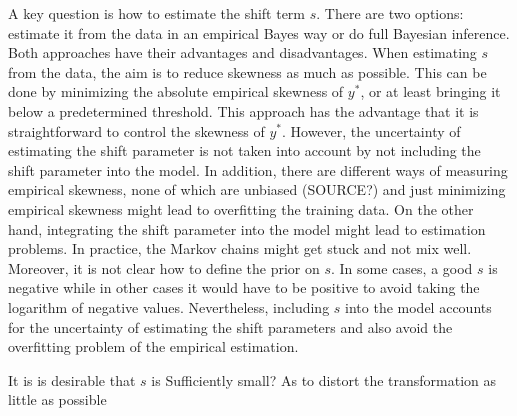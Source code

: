 A key question is how to estimate the shift term $s$.
There are two options: estimate it from the data in an empirical Bayes way or do full Bayesian inference.
Both approaches have their advantages and disadvantages.
When estimating $s$ from the data, the aim is to reduce skewness as much as possible.
This can be done by minimizing the absolute empirical skewness of $y^*$, or at least bringing it below a predetermined threshold.
This approach has the advantage that it is straightforward to control the skewness of $y^*$.
However, the uncertainty of estimating the shift parameter is not taken into account by not including the shift parameter into the model.
In addition, there are different ways of measuring empirical skewness, none of which are unbiased (SOURCE?) and just minimizing empirical skewness might lead to overfitting the training data.
On the other hand, integrating the shift parameter into the model might lead to estimation problems. In practice, the Markov chains might get stuck and not mix well.
Moreover, it is not clear how to define the prior on $s$.
In some cases, a good $s$ is negative while in other cases it would have to be positive to avoid taking the logarithm of negative values.
Nevertheless, including $s$ into the model accounts for the uncertainty of estimating the shift parameters and also avoid the overfitting problem of the empirical estimation.

It is is desirable that  $s$ is Sufficiently small? As to distort the transformation as little as possible


